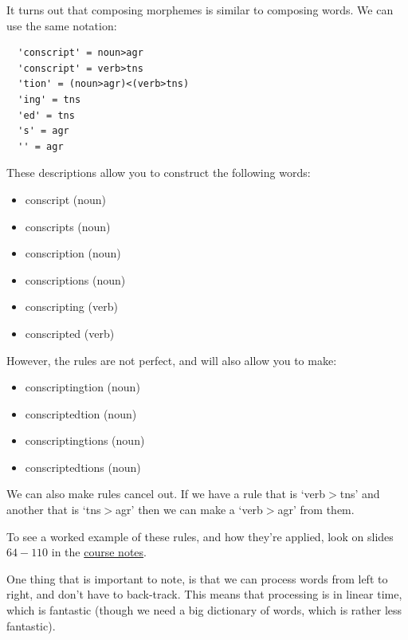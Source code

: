 It turns out that composing morphemes is similar to composing words. We can use the same notation:

\begin{verbatim}
  'conscript' = noun>agr
  'conscript' = verb>tns
  'tion' = (noun>agr)<(verb>tns)
  'ing' = tns
  'ed' = tns
  's' = agr
  '' = agr
\end{verbatim}

These descriptions allow you to construct the following words:

\begin{mymulticols}
  \begin{itemize}
    \item conscript (noun)
    \item conscripts (noun)
    \item conscription (noun)
    \item conscriptions (noun)
    \item conscripting (verb)
    \item conscripted (verb)
  \end{itemize}
\end{mymulticols}

However, the rules are not perfect, and will also allow you to make:

\begin{mymulticols}
  \begin{itemize}
    \item conscriptingtion (noun)
    \item conscriptedtion (noun)
    \item conscriptingtions (noun)
    \item conscriptedtions (noun)
  \end{itemize}
\end{mymulticols}

We can also make rules cancel out. If we have a rule that is `verb$>$tns' and
another that is `tns$>$agr' then we can make a `verb$>$agr' from them.

To see a worked example of these rules, and how they're applied, look on slides
$64-110$ in the
\href{http://studentnet.cs.manchester.ac.uk/ugt/2015/COMP34411/COMP34411.pdf}
{course notes}.

One thing that is important to note, is that we can process words from left to
right, and don't have to back-track. This means that processing is in linear
time, which is fantastic (though we need a big dictionary of words, which is
rather less fantastic).

